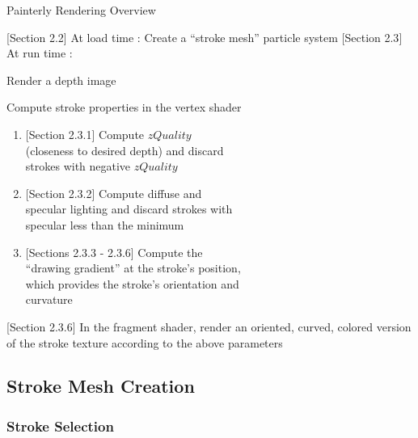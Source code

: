 \documentclass[conference]{acmsiggraph}
\begin{document}
\begin{algorithm}
\DontPrintSemicolon
\caption{Painterly Rendering Overview}
  {[}Section 2.2{]} At load time :  {
     {
      Create a ``stroke mesh'' particle system
    }
  }
  {[}Section 2.3{]} At run time :  {
    Render a depth image \\
     {

       {

         {
          Compute stroke properties in the vertex shader \\
          \begin{enumerate}
            \item {[}Section 2.3.1{]} Compute $zQuality$ \\(closeness to
              desired depth) and discard \\ strokes with negative $zQuality$
            \item  {[}Section 2.3.2{]} Compute diffuse and \\ specular
              lighting and discard strokes with \\ specular less than the
              minimum
            \item {[}Sections 2.3.3 - 2.3.6{]} Compute the \\
              ``drawing gradient'' at the stroke's position, \\ which provides
              the stroke's orientation and \\ curvature
          \end{enumerate}

          {[}Section 2.3.6{]} In the fragment shader, render an oriented,
          curved, colored version of the stroke texture according to the
          above parameters
        }

      }

    }
  }
\end{algorithm}

\subsection{Stroke Mesh Creation}

\subsubsection{Stroke Selection}
\end{document}

